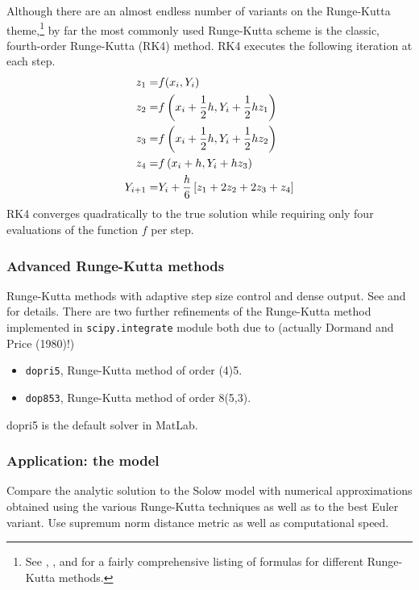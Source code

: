 \documentclass[11pt]{article}
\begin{document}
Although there are an almost endless number of variants on the Runge-Kutta theme,\footnote{See \cite{abramowitz1964handbook}, \cite{gear1971numerical}, and \cite{shampine1986some} for a fairly comprehensive listing of formulas for different Runge-Kutta methods.} by far the most commonly used Runge-Kutta scheme is the classic, fourth-order Runge-Kutta (RK4) method. RK4 executes the following iteration at each step.
\begin{align}
	z_1 =& f(x_i, Y_i) \notag \\
	z_2 =& f\left(x_i + \frac{1}{2}h, Y_i + \frac{1}{2}hz_1\right) \notag \\
	z_3 =& f\left(x_i + \frac{1}{2}h, Y_i + \frac{1}{2}hz_2\right) \notag \\
	z_4 =& f\left(x_i + h, Y_i + hz_3\right) \notag \\
	Y_{i+1} =& Y_i + \frac{h}{6}\left[z_1 + 2z_2 + 2z_3 + z_4\right] 
\end{align}
RK4 converges quadratically to the true solution while requiring only four evaluations of the function $f$ per step.   

\subsubsection{Advanced Runge-Kutta methods}
Runge-Kutta methods with adaptive step size control and dense output.  See \cite{dormand1980family} and \cite{shampine1986some} for details. There are two further refinements of the Runge-Kutta method implemented in \texttt{scipy.integrate} module both due to \cite{hairer1993solving} (actually Dormand and Price (1980)!)
\begin{itemize}
	\item \texttt{dopri5}, Runge-Kutta method of order (4)5.
	\item \texttt{dop853}, Runge-Kutta method of order 8(5,3). 
\end{itemize}
dopri5 is the default solver in MatLab.

\subsubsection{Application: the \cite{solow1956contribution} model}
Compare the analytic solution to the Solow model with numerical approximations obtained using the various Runge-Kutta techniques as well as to the best Euler variant.  Use supremum norm distance metric as well as computational speed.
\end{document}
